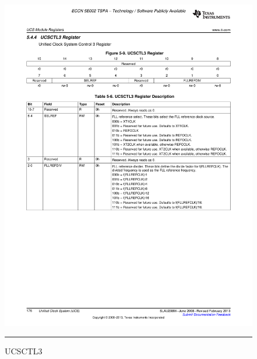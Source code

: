 \pagebreak
\begin{figure}[H]
  \centering
  \includegraphics [angle=0, width=16cm]{./Figures/Chap6_Horloges/UCSCTL3.pdf}
  \rule{35em}{0.5pt}
  \caption{UCSCTL3}
  \label{fig:UCSCTL3}
\end{figure}


